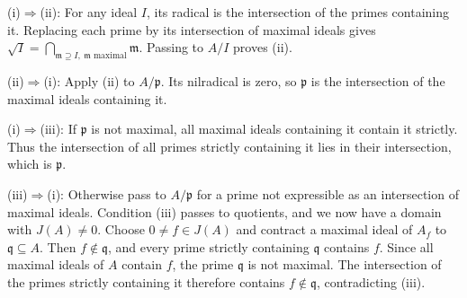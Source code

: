 (i)$\Rightarrow$(ii): For any ideal $I$, its radical is the intersection of the primes containing it. Replacing each prime by its intersection of maximal ideals gives $\sqrt I=\bigcap_{\mathfrak{m}\supseteq I,\ \mathfrak{m}\text{ maximal}}\mathfrak{m}$. Passing to $A/I$ proves (ii).

(ii)$\Rightarrow$(i): Apply (ii) to $A/\mathfrak{p}$. Its nilradical is zero, so $\mathfrak{p}$ is the intersection of the maximal ideals containing it.

(i)$\Rightarrow$(iii): If $\mathfrak{p}$ is not maximal, all maximal ideals containing it contain it strictly. Thus the intersection of all primes strictly containing it lies in their intersection, which is $\mathfrak{p}$.

(iii)$\Rightarrow$(i): Otherwise pass to $A/\mathfrak{p}$ for a prime not expressible as an intersection of maximal ideals. Condition (iii) passes to quotients, and we now have a domain with $J(A)\neq0$. Choose $0\neq f\in J(A)$ and contract a maximal ideal of $A_f$ to $\mathfrak{q}\subseteq A$. Then $f\notin\mathfrak{q}$, and every prime strictly containing $\mathfrak{q}$ contains $f$. Since all maximal ideals of $A$ contain $f$, the prime $\mathfrak{q}$ is not maximal. The intersection of the primes strictly containing it therefore contains $f\notin\mathfrak{q}$, contradicting (iii).
